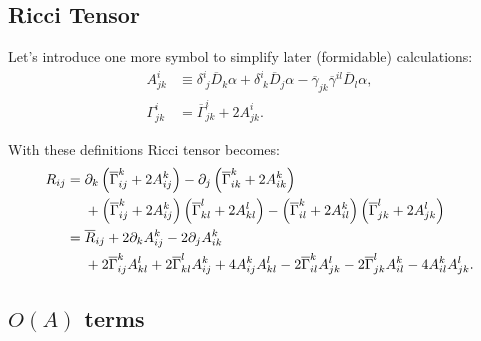 \documentclass[aps,prd,preprint]{revtex4-1}
\newcommand{\ogamma}{\overline{\gamma}}
\newcommand{\OGamma}{\overline{\Gamma}}
\newcommand{\OD}{\overline{D}}
\begin{document}
\subsection{Ricci Tensor}

Let's introduce one more symbol to simplify later (formidable) calculations:
\begin{align}\label{eq:A}
A^i_{jk} & \equiv
  \delta^i_{\; j} \OD_k \alpha + \delta^i_{\; k} \OD_j \alpha - \ogamma_{jk} \ogamma^{il}  \OD_l \alpha, \\
\Gamma^i_{jk} & = \OGamma^i_{jk} + 2 A^i_{jk}.
\end{align}

With these definitions Ricci tensor becomes:
\begin{align}\label{eq:R-expanded}
R_{ij} = \; & \partial_k \left( \OGamma^k_{ij} + 2 A^k_{ij} \right) -
  \partial_j \left( \OGamma^k_{ik} + 2 A^k_{ik} \right) \notag \\
  & + \left( \OGamma^k_{ij} + 2 A^k_{ij} \right) \left( \OGamma^l_{kl} + 2 A^l_{kl} \right) -
  \left( \OGamma^k_{il} + 2 A^k_{il} \right) \left( \OGamma^l_{jk} + 2 A^l_{jk} \right) \\
= \; & \overline{R}_{ij} + 2 \partial_k A^k_{ij} -2 \partial_j A^k_{ik} \notag \\
  & + 2 \OGamma^k_{ij} A^l_{kl}  + 2 \OGamma^l_{kl} A^k_{ij} + 4 A^k_{ij} A^l_{kl} -
  2 \OGamma^k_{il} A^l_{jk} - 2 \OGamma^l_{jk} A^k_{il} - 4 A^k_{il} A^l_{jk}.
\end{align}

\subsection{\texorpdfstring{$O(A)$}{Single-A} terms}
\end{document}
